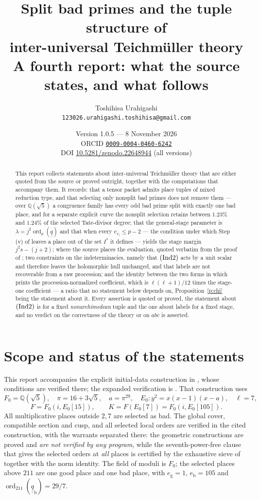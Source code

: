 \documentclass[11pt]{article}
\title{Split bad primes and the tuple structure of\\
inter-universal Teichm\"uller theory\\
\large A fourth report: what the source states, and what follows}
\author{Toshihisa Urahigashi\\
\small\texttt{123026.urahigashi.toshihisa@gmail.com}}
\date{Version 1.0.5 --- 8 November 2026\\[3pt]
\small ORCID \href{https://orcid.org/0009-0004-0460-6242}{\texttt{0009-0004-0460-6242}}\\[3pt]
\small DOI \href{https://doi.org/10.5281/zenodo.22648944}{10.5281/zenodo.22648944} (all versions)}
\theoremstyle{plain}
\theoremstyle{definition}
\newcommand{\Ind}[1]{\textup{(Ind#1)}}
\newcommand{\ord}{\operatorname{ord}}
\begin{document}
\maketitle

\begin{abstract}
This report collects statements about inter-universal Teichm\"uller theory that
are either quoted from the source or proved outright, together with the
computations that accompany them.  It records: that a tensor packet admits
place tuples of mixed reduction type, and that selecting only nonsplit bad
primes does not remove them --- over $\mathbb Q(\sqrt5)$ a congruence family has
every odd bad prime split with exactly one bad place, and for a separate
explicit curve the nonsplit selection retains between $1.23\%$ and $1.24\%$ of
the selected Tate-divisor degree; that the general-stage parameter is
$\lambda=j^2\ord_p(\underline{\underline q})$ and that when every $e_{v_i}\le p-2$ ---
the condition under which Step (v) of \cite{IUT4} leaves a place out of the set $I^*$
it defines --- \cite[Prop.~1.4(iii)]{IUT4} yields the stage margin
$j^2s-(j+2)$; where the source places the evaluation, quoted verbatim from the
proof of \cite[Cor.~3.12]{IUT3}; two constraints on the indeterminacies, namely
that $\Ind2$ acts by a unit scalar and therefore leaves the holomorphic hull
unchanged, and that labels are not recoverable from a raw procession; and the
identity between the two forms in which \cite[Thm.~1.10]{IUT4} prints the
procession-normalized coefficient, which is $\ell(\ell+1)/12$ times the stage-one
coefficient --- a ratio that no statement below depends on, Proposition~\ref{p:chi}
being the statement about it.  Every assertion is quoted or proved,
the statement about $\Ind2$ is for a fixed \emph{nonarchimedean} tuple and the one
about labels for a fixed
stage, and no verdict on the correctness of the theory or on $abc$ is asserted.
\end{abstract}

\section{Scope and status of the statements}\label{s:scope}

This report accompanies the explicit initial-data construction in
\cite[Thm.~1]{First}, whose conditions are verified there; the expanded
verification is \cite[\S\S2--5]{Firstfull}.  That construction uses
\[
 F_0=\mathbb Q(\sqrt5),\quad \pi=16+3\sqrt5,\quad a=\pi^{29},\quad
 E_0:y^2=x(x-1)(x-a),\quad \ell=7,
\]
\[
 F=F_0(i,E_0[15]),\qquad K=F(E_0[7])=F_0(i,E_0[105]).
\]
All multiplicative places outside $2,7$ are selected as bad.  The global
cover, compatible section and cusp, and all selected local orders are
verified in the cited construction, with the warrants separated there: the geometric
constructions are proved and \emph{are not verified by any program}, while the
seventh-power-free clause that gives the selected orders at \emph{all} places is
certified by the exhaustive sieve of \cite[\S9]{First} together with the norm
identity.  The field of moduli is $F_0$; the
selected places above $211$ are one good place and one bad place, with
$e_{\mathrm g}=1$, $e_{\mathrm b}=105$ and
$\ord_{211}(\underline{\underline q}_{\mathrm b})=29/7$.
\end{document}
